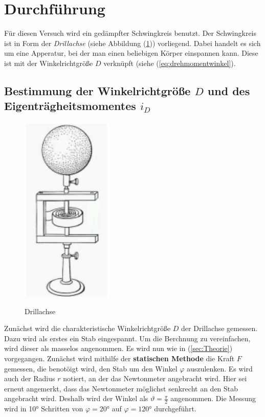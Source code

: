 \section{Durchführung}
\label{sec:Durchführung}

Für diesen Versuch wird ein gedämpfter Schwingkreis benutzt.
Der Schwingkreis ist in Form der \textit{Drillachse} (siehe Abbildung (\ref{fig:drillachse})) vorliegend.
Dabei handelt es sich um eine Apperatur, bei der man einen beliebigen Körper einspannen kann.
Diese ist mit der Winkelrichtgröße $D$ verknüpft (siehe (\ref{eq:drehmomentwinkel}).

\subsection{Bestimmung der Winkelrichtgröße $D$ und des Eigenträgheitsmomentes $i_{D}$} \label{subsec:Winkelrichtgröße}

\begin{figure}
    \caption{Drillachse}
    \centering
    \includegraphics{pictures/Drillachse.pdf}
    \label{fig:drillachse}
\end{figure}

Zunächst wird die charakteristische Winkelrichtgröße $D$ der Drillachse gemessen.
Dazu wird als erstes ein Stab eingespannt.
Um die Berchnung zu vereinfachen, wird dieser als masselos angenommen.
Es wird nun wie in (\ref{sec:Theorie}) vorgegangen.
Zunächst wird mithilfe der \textbf{statischen Methode} die Kraft $F$ gemessen, die benotöigt wird,
den Stab um den Winkel $\varphi$ auszulenken.
Es wird auch der Radius $r$ notiert, an der das Newtonmeter angebracht wird.
Hier sei erneut angemerkt, dass das Newtonmeter möglichst senkrecht an den Stab angebracht wird.
Deshalb wird der Winkel als $\vartheta = \frac{\pi}{2}$ angenommen.
Die Messung wird in 10° Schritten von $\varphi = 20°$ auf $\varphi = 120°$ durchgeführt. \\

